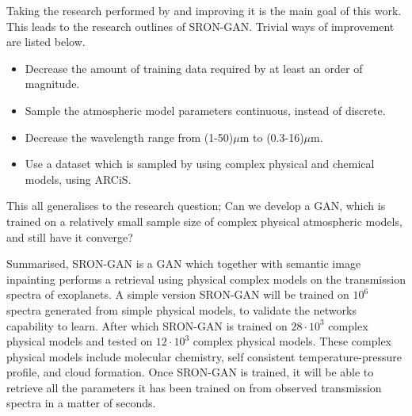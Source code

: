 Taking the research performed by \cite{zingales2018exogan} and improving it is the main goal of this work. This leads to the research outlines of SRON-GAN. Trivial ways of improvement are listed below.


\begin{itemize}
\item Decrease the amount of training data required by at least an order of magnitude.
\item Sample the atmospheric model parameters continuous, instead of discrete.
\item Decrease the wavelength range from (1-50)$\mu$m to (0.3-16)$\mu$m.
\item Use a dataset which is sampled by using complex physical and chemical models, using ARCiS.
\end{itemize}
This all generalises to the research question; Can we develop a GAN, which is trained on a relatively small sample size of complex physical atmospheric models, and still have it converge?


Summarised, SRON-GAN is a GAN which together with semantic image inpainting performs a retrieval using physical complex models on the transmission spectra of exoplanets. A simple version SRON-GAN will be trained on $10^6$ spectra generated from simple physical models, to validate the networks capability to learn. After which SRON-GAN is trained on $28\cdot10^3$ complex physical models and tested on $12\cdot10^3$ complex physical models. These complex physical models include molecular chemistry, self consistent temperature-pressure profile, and cloud formation. Once SRON-GAN is trained, it will be able to retrieve all the parameters it has been trained on from observed transmission spectra in a matter of seconds.